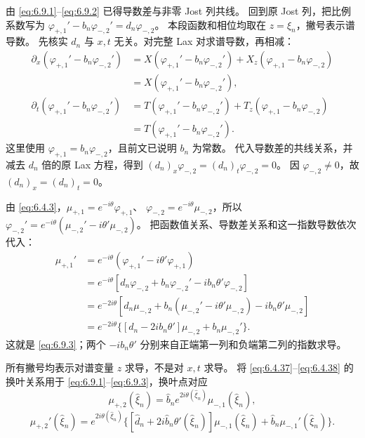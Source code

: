 \documentclass[lang=cn,scheme=chinese,mode=simple,device=normal,color=blue,
math=cm,thmcnt=section,12pt]{elegantbook}
\newcommand{\eqq}[2]{\tag{#1}\label{eq:#1}#2}
\begin{document}
\begin{callout}[计算：(6.9.3) 的推导]
    由 \eqref{eq:6.9.1}--\eqref{eq:6.9.2} 已得导数差与非零 Jost 列共线。
    回到原 Jost 列，把比例系数写为
    $\varphi_{+,1}'-b_n\varphi_{-,2}'=d_n\varphi_{-,2}$。
    本段函数和相位均取在 $z=\xi_n$，撇号表示谱导数。
    先核实 $d_n$ 与 $x,t$ 无关。对完整 Lax 对求谱导数，再相减：
    \[
        \begin{aligned}
            \partial_x(\varphi_{+,1}'-b_n\varphi_{-,2}')
             & =X(\varphi_{+,1}'-b_n\varphi_{-,2}')+X_z(\varphi_{+,1}-b_n\varphi_{-,2}) \\
             & =X(\varphi_{+,1}'-b_n\varphi_{-,2}'),                                    \\
            \partial_t(\varphi_{+,1}'-b_n\varphi_{-,2}')
             & =T(\varphi_{+,1}'-b_n\varphi_{-,2}')+T_z(\varphi_{+,1}-b_n\varphi_{-,2}) \\
             & =T(\varphi_{+,1}'-b_n\varphi_{-,2}').
        \end{aligned}
    \]
    这里使用 $\varphi_{+,1}=b_n\varphi_{-,2}$，且前文已说明 $b_n$ 为常数。
    代入导数差的共线关系，并减去 $d_n$ 倍的原 Lax 方程，得到
    $(d_n)_x\varphi_{-,2}=(d_n)_t\varphi_{-,2}=0$。
    因 $\varphi_{-,2}\ne0$，故 $(d_n)_x=(d_n)_t=0$。

    由 \eqref{eq:6.4.3}，$\mu_{+,1}=e^{-i\theta}\varphi_{+,1}$、
    $\varphi_{-,2}=e^{-i\theta}\mu_{-,2}$，所以
    $\varphi_{-,2}'=e^{-i\theta}(\mu_{-,2}'-i\theta'\mu_{-,2})$。
    把函数值关系、导数差关系和这一指数导数依次代入：
    \[
        \begin{aligned}
            \mu_{+,1}'
             & =e^{-i\theta}(\varphi_{+,1}'-i\theta'\varphi_{+,1})                                 \\
             & =e^{-i\theta}[d_n\varphi_{-,2}+b_n\varphi_{-,2}'-ib_n\theta'\varphi_{-,2}]          \\
             & =e^{-2i\theta}[d_n\mu_{-,2}+b_n(\mu_{-,2}'-i\theta'\mu_{-,2})-ib_n\theta'\mu_{-,2}] \\
             & =e^{-2i\theta}\{[d_n-2ib_n\theta']\mu_{-,2}+b_n\mu_{-,2}'\}.
        \end{aligned}
    \]
    这就是 \eqref{eq:6.9.3}；两个 $-ib_n\theta'$ 分别来自正端第一列和负端第二列的指数求导。
\end{callout}


所有撇号均表示对谱变量 $z$ 求导，不是对 $x,t$ 求导。
将 \eqref{eq:6.4.37}--\eqref{eq:6.4.38} 的换叶关系用于 \eqref{eq:6.9.1}--\eqref{eq:6.9.3}，换叶点对应
\begin{equation}\eqq{6.9.4}{\mu_{+,2}(\widehat\xi_n)=\widehat b_ne^{2i\theta(\widehat\xi_n)}
        \mu_{-,1}(\widehat\xi_n),}\end{equation}
\begin{equation}
    \eqq{6.9.5}{\mu_{+,2}'(\widehat\xi_n)=e^{2i\theta(\widehat\xi_n)}
        \{[\widehat d_n+2i\widehat b_n\theta'(\widehat\xi_n)]\mu_{-,1}(\widehat\xi_n)
        +\widehat b_n\mu_{-,1}'(\widehat\xi_n)\}.}
\end{equation}
\end{document}
